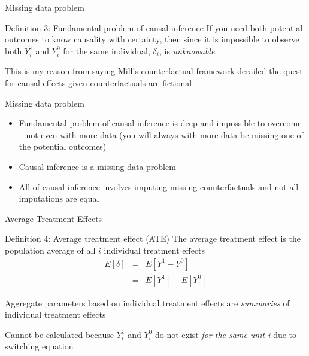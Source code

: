 \documentclass{beamer}
\begin{document}
\begin{frame}{Missing data problem}


    \begin{block}{Definition 3: Fundamental problem of causal inference}
      If you need both potential outcomes to know causality with certainty, then since it is impossible to observe both $Y_i^1$ and $Y_i^0$ for the same individual, $\delta_i$, is \emph{unknowable}.
    \end{block}

This is my reason from saying Mill's counterfactual framework derailed the quest for causal effects given counterfactuals are fictional
    
\end{frame}

\begin{frame}{Missing data problem}


    
      \begin{itemize}
    \item Fundamental problem of causal inference is deep and impossible to overcome -- not even with more data (you will always with more data be missing one of the potential outcomes)
    \item Causal inference is a missing data problem 
    \item All of causal inference involves imputing missing counterfactuals and not all imputations are equal
  \end{itemize}

    
\end{frame}




\begin{frame}{Average Treatment Effects}

  \begin{block}{Definition 4: Average treatment effect (ATE)}
    The average treatment effect is the population average of all $i$ individual treatment effects
    \begin{eqnarray*}
      E[\delta]&=&E[Y^1-Y^0]\\
      &=&E[Y^1] - E[Y^0]
    \end{eqnarray*}
  \end{block}

  \bigskip

Aggregate parameters based on individual treatment effects are \emph{summaries} of individual treatment effects

\bigskip

  Cannot be calculated because $Y^1_i$ and $Y^0_i$ do not exist \emph{for the same unit i} due to switching equation

\end{frame}
\end{document}
